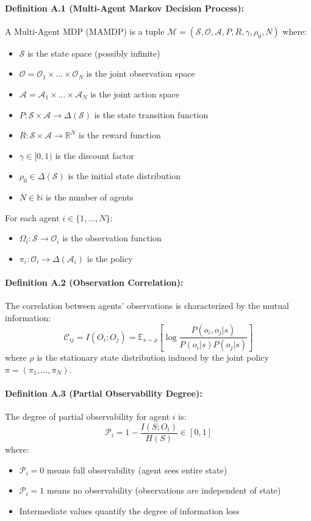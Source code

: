 \documentclass[10pt, letterpaper]{article}
\begin{document}
\paragraph{Definition A.1 (Multi-Agent Markov Decision Process):} A Multi-Agent MDP (MAMDP) is a tuple $\mathcal{M} = (\mathcal{S}, \mathcal{O}, \mathcal{A}, P, R, \gamma, \rho_0, N)$ where:
\begin{itemize}
    \item $\mathcal{S}$ is the state space (possibly infinite)
    \item $\mathcal{O} = \mathcal{O}_1 \times ... \times \mathcal{O}_N$ is the joint observation space
    \item $\mathcal{A} = \mathcal{A}_1 \times ... \times \mathcal{A}_N$ is the joint action space
    \item $P: \mathcal{S} \times \mathcal{A} \to \Delta(\mathcal{S})$ is the state transition function
    \item $R: \mathcal{S} \times \mathcal{A} \to \mathbb{R}^N$ is the reward function
    \item $\gamma \in [0,1)$ is the discount factor
    \item $\rho_0 \in \Delta(\mathcal{S})$ is the initial state distribution
    \item $N \in \mathbb{N}$ is the number of agents
\end{itemize}
For each agent $i \in \{1, ..., N\}$:
\begin{itemize}
    \item $\Omega_i: \mathcal{S} \to \mathcal{O}_i$ is the observation function
    \item $\pi_i: \mathcal{O}_i \to \Delta(\mathcal{A}_i)$ is the policy
\end{itemize}

\paragraph{Definition A.2 (Observation Correlation):} The correlation between agents' observations is characterized by the mutual information:
\[\mathcal{C}_{ij} = I(O_i; O_j) = \mathbb{E}_{s \sim \rho} \left[ \log \frac{P(o_i, o_j | s)}{P(o_i | s) P(o_j | s)} \right]\]
where $\rho$ is the stationary state distribution induced by the joint policy $\pi = (\pi_1, ..., \pi_N)$.

\paragraph{Definition A.3 (Partial Observability Degree):} The degree of partial observability for agent $i$ is:
\[\mathcal{P}_i = 1 - \frac{I(S; O_i)}{H(S)} \in [0, 1]\]
where:
\begin{itemize}
    \item $\mathcal{P}_i = 0$ means full observability (agent sees entire state)
    \item $\mathcal{P}_i = 1$ means no observability (observations are independent of state)
    \item Intermediate values quantify the degree of information loss
\end{itemize}
\end{document}
